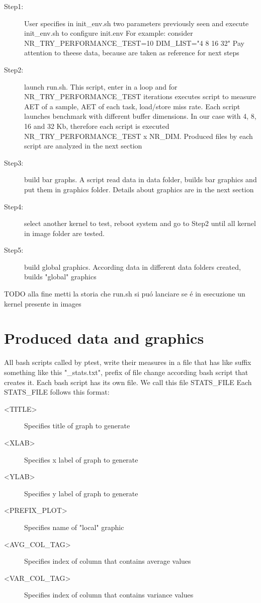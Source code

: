 \documentclass[a4paper,10pt]{article}
\begin{document}
\begin{multicols}{2}
\begin{description}
	\item[Step1:] User specifies in init\_env.sh two parameters previously seen 
and execute init\_env.sh to configure init.env 
For example: consider NR\_TRY\_PERFORMANCE\_TEST=10 DIM\_LIST="4 8 16 32"
Pay attention to theese data, because are taken as reference for next steps
	\item[Step2:] launch run.sh. This script, enter in a loop and for 
NR\_TRY\_PERFORMANCE\_TEST iterations executes script to measure 
AET of a sample, AET of each task, load/store miss rate. Each script 
launches benchmark with different buffer dimensions. In our case 
with 4, 8, 16 and 32 Kb, therefore each script is executed 
NR\_TRY\_PERFORMANCE\_TEST x NR\_DIM. 
Produced files by each script are analyzed in the next section 
	\item[Step3:] build bar graphs. A script read data in data folder,
builds bar graphics and put them in graphics folder. Details about graphics are
in the next section
	\item[Step4:] select another kernel to test, reboot system and go to Step2 
until all kernel in image folder are tested.
	\item[Step5:] build global graphics. According data in different data folders
created, builds "global" graphics

\end{description}

TODO alla fine metti la storia che run.sh si pu\'o lanciare se \'e in esecuzione
un kernel presente in images

\section{Produced data and graphics}

All bash scripts called by ptest, write their measures in a file that has like
suffix something like this "\_stats.txt", prefix of file change according bash 
script that creates it. Each bash script has its own file. We call this file STATS\_FILE 
Each STATS\_FILE follows this format:

\begin{description}
	\item[<TITLE>] Specifies title of graph to generate
	\item[<XLAB>] Specifies x label of graph to generate
	\item[<YLAB>] Specifies y label of graph to generate
	\item[<PREFIX\_PLOT>] Specifies name of "local" graphic
	\item[<AVG\_COL\_TAG>] Specifies index of column that contains average values
	\item[<VAR\_COL\_TAG>] Specifies index of column that contains variance values
\end{description}


\end{multicols}
\end{document}
